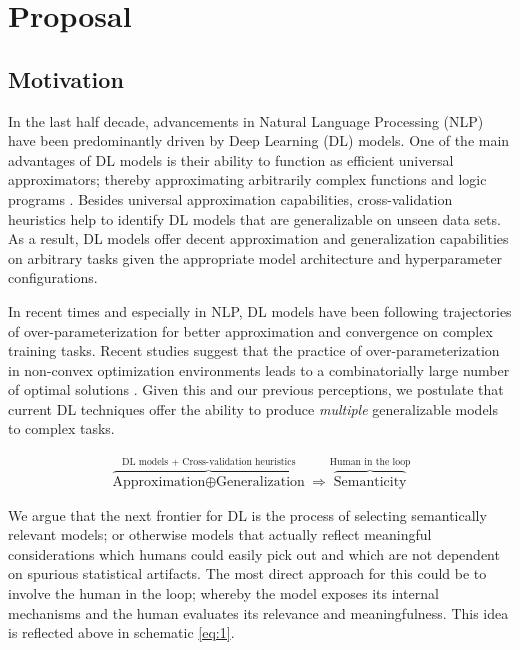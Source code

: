 \section{Proposal}

\subsection{Motivation}

In the last half decade, advancements in Natural Language Processing (NLP) have
been predominantly driven by Deep Learning (DL) models. One of the main
advantages of DL models is their ability to function as efficient universal
approximators; thereby approximating arbitrarily complex functions and logic
programs \citep{cybenko1989approximation, hornik1989multilayer,
  kepner2018sparse}. Besides universal approximation capabilities,
cross-validation heuristics help to identify DL models that are generalizable on
unseen data sets. As a result, DL models offer decent approximation and
generalization capabilities on arbitrary tasks given the appropriate model
architecture and hyperparameter configurations.

In recent times and especially in NLP, DL models have been following
trajectories of over-parameterization for better approximation and convergence
on complex training tasks. Recent studies suggest that the practice of
over-parameterization in non-convex optimization environments leads to a
combinatorially large number of optimal solutions \citep{kepner2018sparse}.
Given this and our previous perceptions, we postulate that current DL techniques
offer the ability to produce \textit{multiple} generalizable models to complex
tasks.

\begin{gather}
  \label{eq:1}
  \overbrace{\text{Approximation} \oplus \text{Generalization}}^{\text{DL models
      + Cross-validation heuristics}} \Rightarrow
  \overbrace{\text{Semanticity}}^{\text{Human in the loop}}
\end{gather}

We argue that the next frontier for DL is the process of selecting semantically
relevant models; or otherwise models that actually reflect meaningful
considerations which humans could easily pick out and which are not dependent on
spurious statistical artifacts. The most direct approach for this could be to
involve the human in the loop; whereby the model exposes its internal mechanisms
and the human evaluates its relevance and meaningfulness. This idea is reflected
above in schematic \ref{eq:1}.

